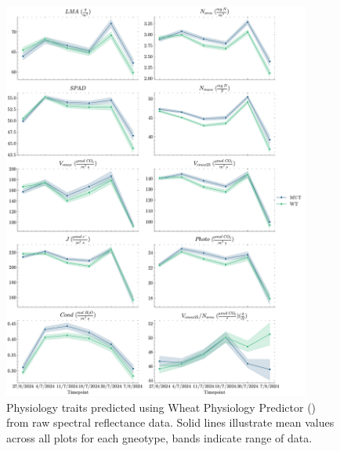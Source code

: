 \documentclass{article}
\begin{document}
\begin{figure}[ht]
	\centering
	\includegraphics[width=0.9\textwidth, height=0.9\textheight]{
		Timeseries.pdf
	}
	\caption{Physiology traits predicted using Wheat Physiology Predictor (\cite{furbank_wheat_2021})
		from raw spectral reflectance data. Solid lines illustrate mean values across
		all plots for each gneotype, bands indicate range of data.}
	\label{timeseries_field_spec}
\end{figure}
\end{document}
